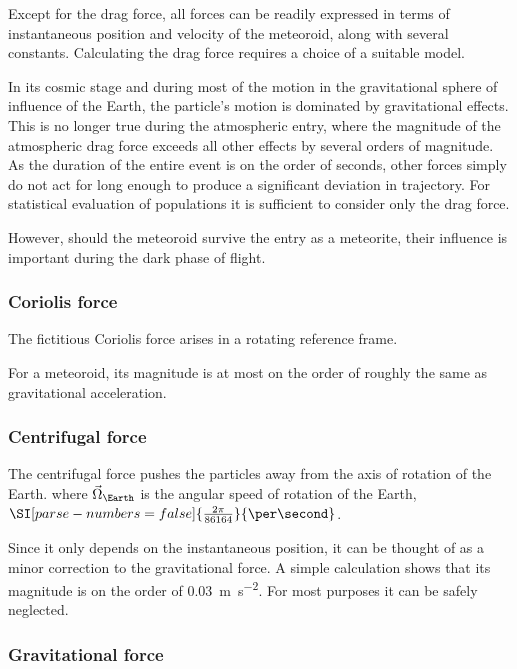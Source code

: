         Except for the drag force, all forces can be readily expressed in terms of instantaneous position and velocity of the meteoroid,
        along with several constants.
        Calculating the drag force requires a choice of a suitable model.

        In its cosmic stage and during most of the motion in the gravitational sphere of influence of the Earth,
        the particle's motion is dominated by gravitational effects. This is no longer true during the atmospheric entry,
        where the magnitude of the atmospheric drag force exceeds all other effects by several orders of magnitude.
        As the duration of the entire event is on the order of seconds, other forces simply do not act for long enough
        to produce a significant deviation in trajectory. For statistical evaluation of populations it is sufficient
        to consider only the drag force.

        However, should the meteoroid survive the entry as a meteorite, their influence is important during the dark phase of flight.

        \subsubsection{Coriolis force} \label{aafC}
            The fictitious Coriolis force arises in a rotating reference frame.

            For a meteoroid, its magnitude is at most on the order of
            roughly the same as gravitational acceleration.

        \subsubsection{Centrifugal force} \label{aafc}
            The centrifugal force pushes the particles away from the axis of rotation of the Earth.
            where $\vec{\Omega}_\Earth$ is the angular speed of rotation of the Earth, $\SI[parse-numbers = false]{\frac{2\pi}{86164}}{\per\second}$.

            Since it only depends on the instantaneous position, it can be thought of as a minor correction to the
            gravitational force. A simple calculation shows that its magnitude is on the order
            of \SI{0.03}{\metre\per\second\squared}. For most purposes it can be safely neglected.

        \subsubsection{Gravitational force} \label{aafg}
            
